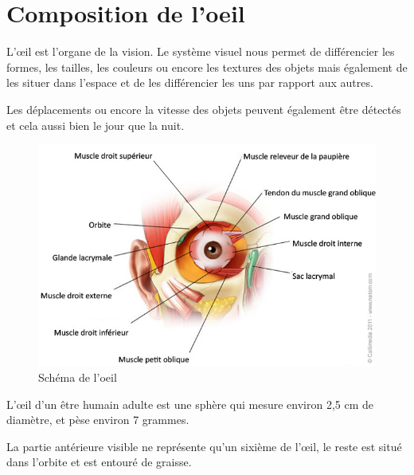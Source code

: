 \documentclass[a4paper, 12pt, onecolumn, openany]{report}
\begin{document}
	\section{Composition de l'oeil}
	L’œil est l’organe de la vision. Le système visuel nous permet de différencier les formes, les tailles, les couleurs ou encore les textures des objets mais également de les situer dans l’espace et de les différencier les uns par rapport aux autres. 
	
	Les déplacements ou encore la vitesse des objets peuvent également être détectés et cela aussi bien le jour que 
la nuit.	

	\begin{figure}[h]
	\includegraphics[scale=0.5]{oeil.jpg}
	\caption{Schéma de l'oeil}
	\label{Schéma de l'oeil}
	\end{figure}
	
	\newpage
	
	L’œil d’un être humain adulte est une sphère qui mesure environ 2,5 cm de diamètre, et pèse environ 7 grammes. 
	
	La partie antérieure visible ne représente qu’un sixième de l’œil, le reste est situé dans l’orbite et est entouré de graisse. 
	
\end{document}

